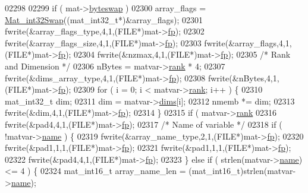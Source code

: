 \begin{DoxyCode}
{{{{{{{{{{{{{{{{02298 
02299     \textcolor{keywordflow}{if} ( mat->\hyperlink{struct__mat__t_a99d207977af5e04941ace56d71817a40}{byteswap} )
02300         array\_flags = \hyperlink{endian_8c_a2e0153996243f0a34df9a5286087cfa3}{Mat\_int32Swap}((mat\_int32\_t*)&array\_flags);
02301     fwrite(&array\_flags\_type,4,1,(FILE*)mat->\hyperlink{struct__mat__t_a85f562e407ca9ad4d2a6e14f839432b7}{fp});
02302     fwrite(&array\_flags\_size,4,1,(FILE*)mat->\hyperlink{struct__mat__t_a85f562e407ca9ad4d2a6e14f839432b7}{fp});
02303     fwrite(&array\_flags,4,1,(FILE*)mat->\hyperlink{struct__mat__t_a85f562e407ca9ad4d2a6e14f839432b7}{fp});
02304     fwrite(&nzmax,4,1,(FILE*)mat->\hyperlink{struct__mat__t_a85f562e407ca9ad4d2a6e14f839432b7}{fp});
02305     \textcolor{comment}{/* Rank and Dimension */}
02306     nBytes = matvar->\hyperlink{group___m_a_t_a84ba70c96ded13cc555fa75b768d9921}{rank} * 4;
02307     fwrite(&dims\_array\_type,4,1,(FILE*)mat->\hyperlink{struct__mat__t_a85f562e407ca9ad4d2a6e14f839432b7}{fp});
02308     fwrite(&nBytes,4,1,(FILE*)mat->\hyperlink{struct__mat__t_a85f562e407ca9ad4d2a6e14f839432b7}{fp});
02309     \textcolor{keywordflow}{for} ( i = 0; i < matvar->\hyperlink{group___m_a_t_a84ba70c96ded13cc555fa75b768d9921}{rank}; i++ ) \{
02310         mat\_int32\_t dim;
02311         dim = matvar->\hyperlink{group___m_a_t_a8e01234e1c862ce3472bb37f5a09b92c}{dims}[i];
02312         nmemb *= dim;
02313         fwrite(&dim,4,1,(FILE*)mat->\hyperlink{struct__mat__t_a85f562e407ca9ad4d2a6e14f839432b7}{fp});
02314     \}
02315     \textcolor{keywordflow}{if} ( matvar->\hyperlink{group___m_a_t_a84ba70c96ded13cc555fa75b768d9921}{rank} %
02316         fwrite(&pad4,4,1,(FILE*)mat->\hyperlink{struct__mat__t_a85f562e407ca9ad4d2a6e14f839432b7}{fp});
02317     \textcolor{comment}{/* Name of variable */}
02318     \textcolor{keywordflow}{if} ( !matvar->\hyperlink{group___m_a_t_a5d4b55b041e3b4fb50c04337f05ad909}{name} ) \{
02319         fwrite(&array\_name\_type,2,1,(FILE*)mat->\hyperlink{struct__mat__t_a85f562e407ca9ad4d2a6e14f839432b7}{fp});
02320         fwrite(&pad1,1,1,(FILE*)mat->\hyperlink{struct__mat__t_a85f562e407ca9ad4d2a6e14f839432b7}{fp});
02321         fwrite(&pad1,1,1,(FILE*)mat->\hyperlink{struct__mat__t_a85f562e407ca9ad4d2a6e14f839432b7}{fp});
02322         fwrite(&pad4,4,1,(FILE*)mat->\hyperlink{struct__mat__t_a85f562e407ca9ad4d2a6e14f839432b7}{fp});
02323     \} \textcolor{keywordflow}{else} \textcolor{keywordflow}{if} ( strlen(matvar->\hyperlink{group___m_a_t_a5d4b55b041e3b4fb50c04337f05ad909}{name}) <= 4 ) \{
02324         mat\_int16\_t array\_name\_len = (mat\_int16\_t)strlen(matvar->\hyperlink{group___m_a_t_a5d4b55b041e3b4fb50c04337f05ad909}{name});
}}}}}}}}}}}}}}}}
\end{DoxyCode}
